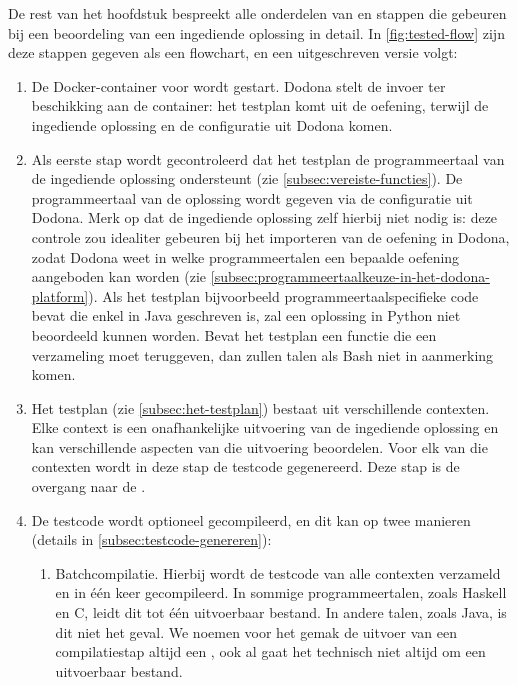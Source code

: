 De rest van het hoofdstuk bespreekt alle onderdelen van en stappen die gebeuren bij een beoordeling van een ingediende oplossing in detail.
In \cref{fig:tested-flow} zijn deze stappen gegeven als een flowchart, en een uitgeschreven versie volgt:

\begin{enumerate}
    \item De Docker-container voor \tested{} wordt gestart.
    Dodona stelt de invoer ter beschikking aan de container: het testplan komt uit de oefening, terwijl de ingediende oplossing en de configuratie uit Dodona komen.
    \item Als eerste stap wordt gecontroleerd dat het testplan de programmeertaal van de ingediende oplossing ondersteunt (zie \cref{subsec:vereiste-functies}).
    De programmeertaal van de oplossing wordt gegeven via de configuratie uit Dodona.
    Merk op dat de ingediende oplossing zelf hierbij niet nodig is: deze controle zou idealiter gebeuren bij het importeren van de oefening in Dodona, zodat Dodona weet in welke programmeertalen een bepaalde oefening aangeboden kan worden (zie \cref{subsec:programmeertaalkeuze-in-het-dodona-platform}).
    Als het testplan bijvoorbeeld programmeertaalspecifieke code bevat die enkel in Java geschreven is, zal een oplossing in Python niet beoordeeld kunnen worden.
    Bevat het testplan een functie die een verzameling moet teruggeven, dan zullen talen als Bash niet in aanmerking komen.
    \item Het testplan (zie \cref{subsec:het-testplan}) bestaat uit verschillende contexten.
    Elke context is een onafhankelijke uitvoering van de ingediende oplossing en kan verschillende aspecten van die uitvoering beoordelen.
    Voor elk van die contexten wordt in deze stap de testcode gegenereerd.
    Deze stap is de overgang naar de .
    \item De testcode wordt optioneel gecompileerd, en dit kan op twee manieren (details in \cref{subsec:testcode-genereren}):
    \begin{enumerate}
        \item Batchcompilatie.
        Hierbij wordt de testcode van alle contexten verzameld en in één keer gecompileerd.
        In sommige programmeertalen, zoals Haskell en C, leidt dit tot één uitvoerbaar bestand.
        In andere talen, zoals Java, is dit niet het geval.
        We noemen voor het gemak de uitvoer van een compilatiestap altijd een , ook al gaat het technisch niet altijd om een uitvoerbaar bestand.

\end{enumerate}
\end{enumerate}
